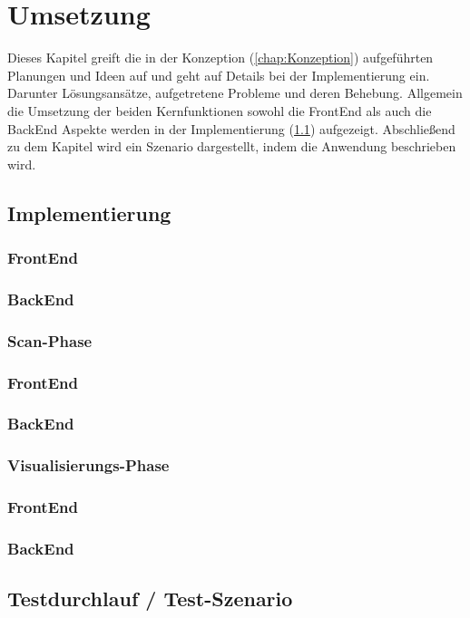 

\chapter{Umsetzung}
\label{chap:Umsetzung}
Dieses Kapitel greift die in der Konzeption (\ref{chap:Konzeption}) aufgeführten Planungen und Ideen auf und geht auf Details bei der 
Implementierung ein. Darunter Lösungsansätze, aufgetretene Probleme und deren Behebung. Allgemein die Umsetzung der beiden Kernfunktionen 
sowohl die FrontEnd als auch die BackEnd Aspekte werden in der Implementierung (\ref{chap:implementierung}) aufgezeigt. Abschließend zu 
dem Kapitel wird ein Szenario dargestellt, indem die Anwendung beschrieben wird.

\section{Implementierung}
\label{chap:implementierung}
\subsection*{FrontEnd}
\subsection*{BackEnd}

\subsection{Scan-Phase} %
\subsection*{FrontEnd}
\subsection*{BackEnd}

\subsection{Visualisierungs-Phase} 
\subsection*{FrontEnd}
\subsection*{BackEnd}

\section{Testdurchlauf / Test-Szenario}
\label{chap:testdurchlauf}